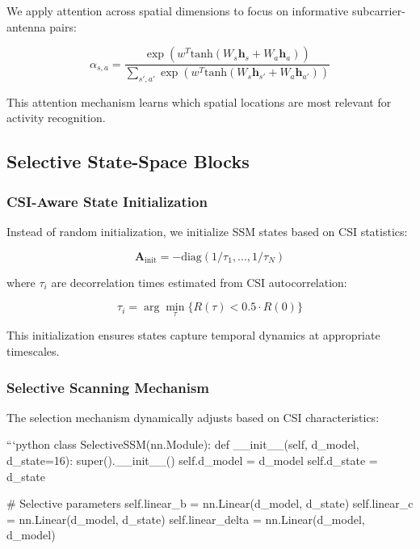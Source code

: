 \documentclass[10pt,journal,compsoc]{IEEEtran}
\begin{document}
We apply attention across spatial dimensions to focus on informative subcarrier-antenna pairs:

\begin{equation}
\alpha_{s,a} = \frac{\exp(w^T \text{tanh}(W_s \mathbf{h}_s + W_a \mathbf{h}_a))}{\sum_{s',a'} \exp(w^T \text{tanh}(W_s \mathbf{h}_{s'} + W_a \mathbf{h}_{a'}))}
\end{equation}

This attention mechanism learns which spatial locations are most relevant for activity recognition.

\subsection{Selective State-Space Blocks}

\subsubsection{CSI-Aware State Initialization}

Instead of random initialization, we initialize SSM states based on CSI statistics:

\begin{equation}
\mathbf{A}_{\text{init}} = -\text{diag}(1/\tau_1, ..., 1/\tau_N)
\end{equation}

where $\tau_i$ are decorrelation times estimated from CSI autocorrelation:

\begin{equation}
\tau_i = \arg\min_{\tau} \{R(\tau) < 0.5 \cdot R(0)\}
\end{equation}

This initialization ensures states capture temporal dynamics at appropriate timescales.

\subsubsection{Selective Scanning Mechanism}

The selection mechanism dynamically adjusts based on CSI characteristics:

```python
class SelectiveSSM(nn.Module):
    def __init__(self, d_model, d_state=16):
        super().__init__()
        self.d_model = d_model
        self.d_state = d_state
        
        # Selective parameters
        self.linear_b = nn.Linear(d_model, d_state)
        self.linear_c = nn.Linear(d_model, d_state)
        self.linear_delta = nn.Linear(d_model, d_model)
        
\end{document}
